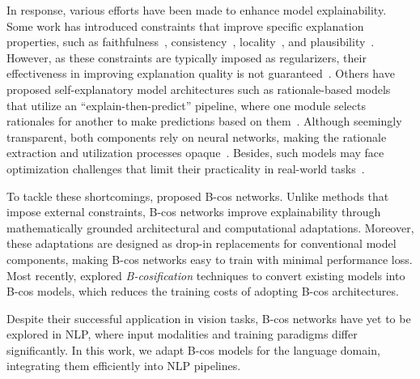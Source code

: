 
In response, various efforts have been made to enhance model explainability. 
Some work has introduced constraints that improve specific explanation properties, such as faithfulness~\citep{tutek2022toward, moradi-etal-2020-training, moradi-etal-2021-measuring}, consistency~\citep{atanasova2022diagnostics}, locality~\citep{NEURIPS2018_3e9f0fc9}, and plausibility~\citep{NEURIPS2021_e0cd3f16}. 
However, as these constraints are typically imposed as regularizers, their effectiveness in improving explanation quality is not guaranteed~\citep{pruthi-etal-2020-learning}. 
Others have proposed self-explanatory model architectures such as rationale-based models that utilize an ``explain-then-predict'' pipeline, where one module selects rationales for another to make predictions based on them~\citep{lei-etal-2016-rationalizing}.
Although seemingly transparent, both components rely on neural networks, making the rationale extraction and utilization processes opaque~\citep{zheng-etal-2022-irrationality, jacovi-goldberg-2021-aligning}. 
Besides, such models may face optimization challenges that limit their practicality in real-world tasks~\citep{lyu-etal-2024-towards}.

To tackle these shortcomings, \citet{Bohle_2022_CVPR} proposed B-cos networks. 
Unlike methods that impose external constraints, B-cos networks improve explainability through mathematically grounded architectural and computational adaptations. 
Moreover, these adaptations are designed as drop-in replacements for conventional model components, making B-cos networks easy to train with minimal performance loss. Most recently, \citet{arya24bcosification} explored \textit{B-cosification} techniques to convert existing models into B-cos models, which reduces the training costs of adopting B-cos architectures. 

Despite their successful application in vision tasks, B-cos networks have yet to be explored in NLP, where input modalities and training paradigms differ significantly. 
In this work, we adapt B-cos models for the language domain, integrating them efficiently into NLP pipelines. 

